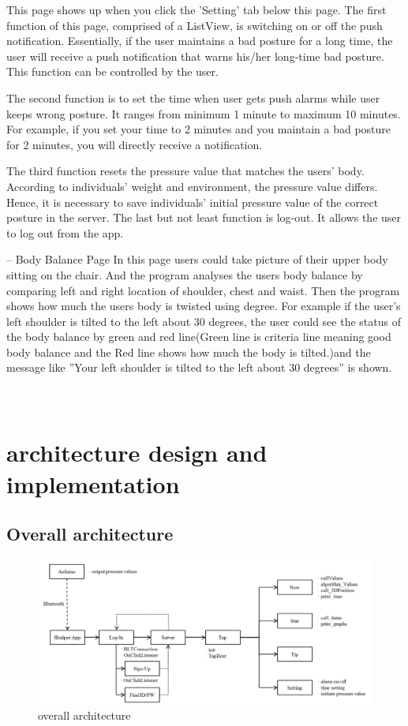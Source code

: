 \documentclass[conference]{IEEEtran}
\begin{document}
This page shows up when you click the 'Setting' tab below this page. The first function of this page, comprised of a ListView, is switching on or off the push notification. Essentially, if the user maintains a bad posture for a long time, the user will receive a push notification that warns his/her long-time bad posture. This function can be controlled by the user. 

The second function is to set the time when user gets push alarms while user keeps wrong posture. It ranges from minimum 1 minute to maximum 10 minutes. For example, if you set your time to 2 minutes and you maintain a bad posture for 2 minutes, you will directly receive a notification.

The third function resets the pressure value that matches the users' body. According to individuals' weight and environment, the pressure value differs. Hence, it is necessary to save individuals' initial pressure value of the  correct posture in the server. The last but not least function is log-out. It allows the user to log out from the app.

 -- Body Balance Page 
 In this page users could take picture of their upper body sitting on the chair. And the program analyses the users body balance by comparing left and right location of shoulder, chest and waist. Then the program shows how much the users body is twisted using degree. For example if the user's left shoulder is tilted to the left about 30 degrees, the user could see the status of the body balance by green and red line(Green line is criteria line meaning good body balance and the Red line shows how much the body is tilted.)and the message like ''Your left shoulder is tilted to the left about 30 degrees'' is shown. 
\\\\\\

\section{architecture design and implementation\\}

\subsection{Overall architecture}

\begin{figure}[H]
\begin{center}
    \includegraphics[scale=0.24]{img_16}
    \caption{overall architecture} 
\end{center}
\end{figure}
\end{document}
